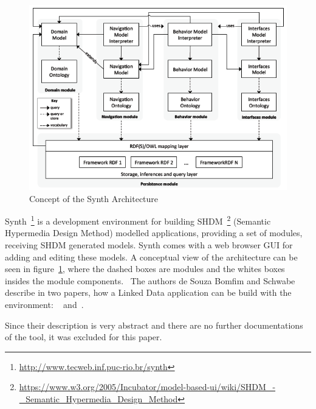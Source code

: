 \begin{figure}[htbp]
	\centering
\includegraphics[width=\textwidth]{img/synth-concept.png}
	\caption{Concept of the Synth Architecture}
	\label{synth_concept}
\end{figure}

Synth~\footnote{\url{http://www.tecweb.inf.puc-rio.br/synth}} is a development environment for building SHDM~\footnote{\url{https://www.w3.org/2005/Incubator/model-based-ui/wiki/SHDM_-_Semantic_Hypermedia_Design_Method}} (Semantic Hypermedia Design Method) modelled applications, providing a set of modules, receiving SHDM generated models. Synth comes with a web browser GUI for adding and editing these models. A conceptual view of the architecture can be seen in figure~\ref{synth_concept}, where the dashed boxes are modules and the whites boxes insides the module components.~\cite{desynth} The authors de Souza Bomfim and Schwabe describe in two papers, how a Linked Data application can be build with the environment: ~\cite{desynth} and~\cite{de2011design}.

Since their description is very abstract and there are no further documentations of the tool, it was excluded for this paper. 